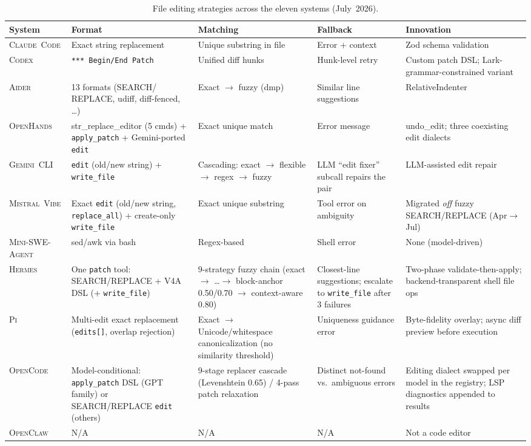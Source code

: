 \documentclass[11pt,a4paper]{article}
\newcommand{\clcode}{\textsc{Claude~Code}\xspace}
\newcommand{\cdx}{\textsc{Codex}\xspace}
\newcommand{\oh}{\textsc{OpenHands}\xspace}
\newcommand{\adr}{\textsc{Aider}\xspace}
\newcommand{\mswe}{\textsc{Mini-SWE-Agent}\xspace}
\newcommand{\ocl}{\textsc{OpenClaw}\xspace}
\newcommand{\vibe}{\textsc{Mistral~Vibe}\xspace}
\newcommand{\gemini}{\textsc{Gemini~CLI}\xspace}
\newcommand{\hrm}{\textsc{Hermes}\xspace}
\newcommand{\pib}{\textsc{Pi}\xspace}
\newcommand{\ocd}{\textsc{OpenCode}\xspace}
\begin{document}
\begin{table}[H]
\centering
\caption{File editing strategies across the eleven systems (July~2026).}
\label{tab:editing}
\scriptsize
\renewcommand{\arraystretch}{1.25}
\begin{tabularx}{\textwidth}{@{}l L{2.9cm} L{3.1cm} L{2.5cm} L{3.4cm}@{}}
\toprule
\textbf{System} & \textbf{Format} & \textbf{Matching} & \textbf{Fallback} & \textbf{Innovation} \\
\midrule
\clcode{} & Exact string replacement & Unique substring in file & Error + context & Zod schema validation \\
\cdx{}    & \texttt{*** Begin/End Patch} & Unified diff hunks & Hunk-level retry & Custom patch DSL; Lark-grammar-constrained variant \\
\adr{}    & 13 formats (SEARCH/ REPLACE, udiff, diff-fenced, \ldots) & Exact $\to$ fuzzy (dmp) & Similar line suggestions & RelativeIndenter \\
\oh{}     & str\_replace\_editor (5 cmds) + \texttt{apply\_patch} + Gemini-ported \texttt{edit} & Exact unique match & Error message & undo\_edit; three coexisting edit dialects \\
\gemini{} & \texttt{edit} (old/new string) + \texttt{write\_file} & Cascading: exact $\to$ flexible $\to$ regex $\to$ fuzzy & LLM ``edit fixer'' subcall repairs the pair & LLM-assisted edit repair \\
\vibe{}   & Exact \texttt{edit} (old/new string, \texttt{replace\_all}) + create-only \texttt{write\_file} & Exact unique substring & Tool error on ambiguity & Migrated \emph{off} fuzzy SEARCH/REPLACE (Apr$\to$Jul) \\
\mswe{}   & sed/awk via bash & Regex-based & Shell error & None (model-driven) \\
\hrm{}    & One \texttt{patch} tool: SEARCH/REPLACE + V4A DSL (+ \texttt{write\_file}) & 9-strategy fuzzy chain (exact $\to$ \ldots $\to$ block-anchor 0.50/0.70 $\to$ context-aware 0.80) & Closest-line suggestions; escalate to \texttt{write\_file} after 3 failures & Two-phase validate-then-apply; backend-transparent shell file ops \\
\pib{}    & Multi-edit exact replacement (\texttt{edits[]}, overlap rejection) & Exact $\to$ Unicode/whitespace canonicalization (no similarity threshold) & Uniqueness guidance error & Byte-fidelity overlay; async diff preview before execution \\
\ocd{}    & Model-conditional: \texttt{apply\_patch} DSL (GPT family) or SEARCH/REPLACE \texttt{edit} (others) & 9-stage replacer cascade (Levenshtein 0.65) / 4-pass patch relaxation & Distinct not-found vs.\ ambiguous errors & Editing dialect swapped per model in the registry; LSP diagnostics appended to results \\
\ocl{}    & N/A & N/A & N/A & Not a code editor \\
\bottomrule
\end{tabularx}
\end{table}
\end{document}
